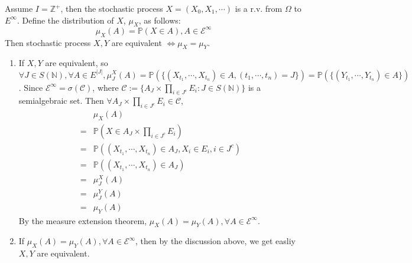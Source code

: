 \documentclass{ctexart}
\begin{document}
\begin{problem}\label{pro:6}
	Assume \(I=\mathbb{Z}^+\), then the stochastic process \(X=(X_0,X_1,\cdots)\) is a r.v. from \(\Omega\) to \(E^\infty\).
	Define the distribution of \(X\), \(\mu_X\), as follows:
	\[
		\mu_X(A)=\mathbb{P}(X \in A),A \in \mathscr{E}^\infty
	\]
	Then stochastic process \(X,Y\) are equivalent \(\iff \mu_X=\mu_Y\).
\end{problem}
\begin{solution}
	\begin{enumerate}
		\item If \(X,Y\) are equivalent, so \(\forall J \in S(\mathbb{N}), \forall A \in E^{|J|},\mu_J^X(A) = \mathbb{P}(\{(X_{t_1},\cdots,X_{t_n}) \in A, (t_1,\cdots,t_n) = J\}) = \mathbb{P}(\{(Y_{t_1},\cdots,Y_{t_n}) \in A\})\).
			Since \(\mathscr{E}^{\infty} = \sigma(\mathscr{C})\), where \(\mathscr{C}:=\{A_J \times \prod_{i \in J^c}E_i: J \in S(\mathbb{N})\}\) is a semialgebraic set.
			Then \(\forall A_J \times \prod_{i \in J^c} E_i \in \mathscr{C}\),
			\begin{equation}
				\begin{aligned}
					  & \mu_X(A)                                                             \\
					= & \mathbb{P}(X \in A_J \times \prod_{i \in J^c}E_i)                    \\
					= & \mathbb{P}((X_{t_1},\cdots,X_{t_n}) \in A_J, X_i \in E_i, i \in J^c) \\
					= & \mathbb{P}((X_{t_1},\cdots,X_{t_n}) \in A_J)                         \\
					= & \mu^X_J(A)                                                           \\
					= & \mu^Y_J(A)                                                           \\
					= & \mu_Y(A)
				\end{aligned}
			\end{equation}
			By the measure extension theorem, \(\mu_X(A) = \mu_Y(A), \forall A \in \mathscr{E}^{\infty}\).
		\item If \(\mu_X(A)=\mu_Y(A), \forall A \in \mathscr{E}^{\infty}\), then by the discussion above,
			we get easliy \(X, Y\) are equivalent.
	\end{enumerate}
\end{solution}
\end{document}
